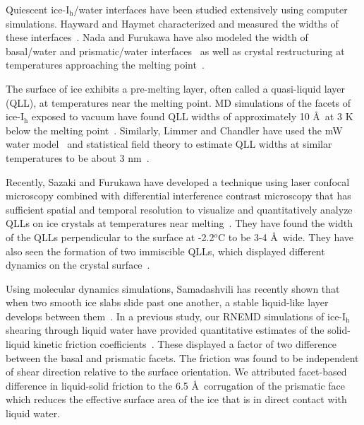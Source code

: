 \documentclass[aps,jcp,preprint,showpacs,superscriptaddress,groupedaddress]{revtex4}  %
\begin{document}
Quiescent ice-I$_\mathrm{h}$/water interfaces have been studied
extensively using computer simulations. Hayward and Haymet
characterized and measured the widths of these
interfaces~\cite{Hayward01,Hayward02}.  Nada and Furukawa have also
modeled the width of basal/water and prismatic/water
interfaces~\cite{Nada95} as well as crystal restructuring at
temperatures approaching the melting point~\cite{Nada00}.

The surface of ice exhibits a pre-melting layer, often called a
quasi-liquid layer (QLL), at temperatures near the melting point.  MD
simulations of the facets of ice-I$_\mathrm{h}$ exposed to vacuum have
found QLL widths of approximately 10 \AA\ at 3 K below the melting
point~\cite{Conde08}. Similarly, Limmer and Chandler have used the mW
water model~\cite{Molinero09} and statistical field theory to estimate
QLL widths at similar temperatures to be about 3 nm~\cite{Limmer14}.

Recently, Sazaki and Furukawa have developed a technique using laser
confocal microscopy combined with differential interference contrast
microscopy that has sufficient spatial and temporal resolution to
visualize and quantitatively analyze QLLs on ice crystals at
temperatures near melting~\cite{Sazaki10}. They have found the width of
the QLLs perpendicular to the surface at -2.2$^{o}$C to be 3-4 \AA\
wide.  They have also seen the formation of two immiscible QLLs, which
displayed different dynamics on the crystal surface~\cite{Sazaki12}.


Using molecular dynamics simulations, Samadashvili has recently shown
that when two smooth ice slabs slide past one another, a stable
liquid-like layer develops between them~\cite{Samadashvili13}. In a
previous study, our RNEMD simulations of ice-I$_\mathrm{h}$ shearing
through liquid water have provided quantitative estimates of the
solid-liquid kinetic friction coefficients~\cite{Louden13}. These
displayed a factor of two difference between the basal and prismatic
facets.  The friction was found to be independent of shear direction
relative to the surface orientation.  We attributed facet-based
difference in liquid-solid friction to the 6.5 \AA\ corrugation of the
prismatic face which reduces the effective surface area of the ice
that is in direct contact with liquid water.
\end{document}
